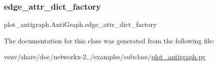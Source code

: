 \mbox{\label{classplot__antigraph_1_1AntiGraph_ae7827dc88bfc6f1c4b3a27fc7918eb6a}} 
\subsubsection{\texorpdfstring{edge\+\_\+attr\+\_\+dict\+\_\+factory}{edge\_attr\_dict\_factory}}
{\footnotesize\ttfamily plot\+\_\+antigraph.\+Anti\+Graph.\+edge\+\_\+attr\+\_\+dict\+\_\+factory\hspace{0.3cm}{\ttfamily [static]}}



The documentation for this class was generated from the following file\+:\begin{DoxyCompactItemize}
\item 
venv/share/doc/networkx-\/2../examples/subclass/\hyperlink{plot__antigraph_8py}{plot\+\_\+antigraph.\+py}\end{DoxyCompactItemize}
